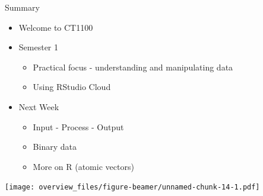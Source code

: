 \documentclass[ignorenonframetext,]{beamer}
\providecommand{\tightlist}{%
  \setlength{\itemsep}{0pt}\setlength{\parskip}{0pt}}
\begin{document}
\begin{frame}{Summary}
\protect\hypertarget{summary}{}

\begin{itemize}
\tightlist
\item
  Welcome to CT1100
\item
  Semester 1

  \begin{itemize}
  \tightlist
  \item
    Practical focus - understanding and manipulating data
  \item
    Using RStudio Cloud
  \end{itemize}
\item
  Next Week

  \begin{itemize}
  \tightlist
  \item
    Input - Process - Output
  \item
    Binary data
  \item
    More on R (atomic vectors)
  \end{itemize}
\end{itemize}

\texttt{[image: overview\_files/figure-beamer/unnamed-chunk-14-1.pdf]}

\end{frame}
\end{document}
